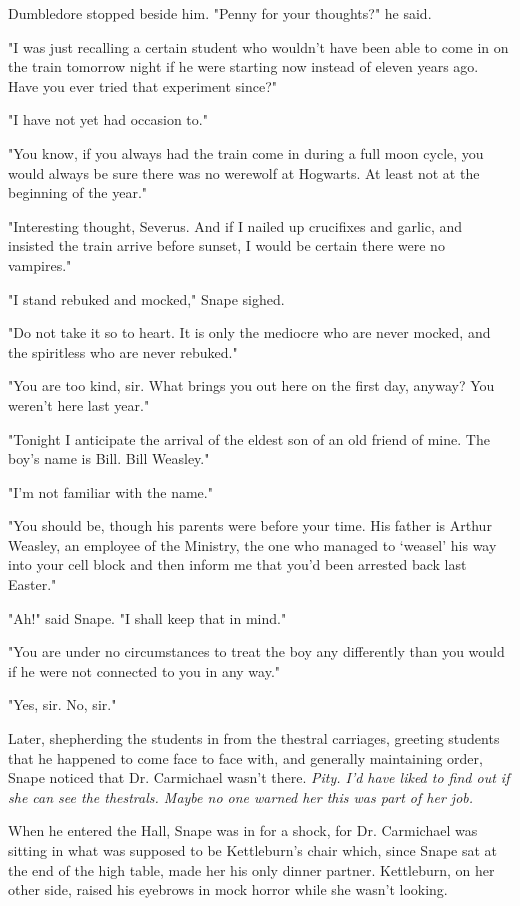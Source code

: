 Dumbledore stopped beside him. "Penny for your thoughts?" he said.

"I was just recalling a certain student who wouldn't have been able to come in on the train tomorrow night if he were starting now instead of eleven years ago. Have you ever tried that experiment since?"

"I have not yet had occasion to."

"You know, if you always had the train come in during a full moon cycle, you would always be sure there was no werewolf at Hogwarts. At least not at the beginning of the year."

"Interesting thought, Severus. And if I nailed up crucifixes and garlic, and insisted the train arrive before sunset, I would be certain there were no vampires."

"I stand rebuked and mocked," Snape sighed.

"Do not take it so to heart. It is only the mediocre who are never mocked, and the spiritless who are never rebuked."

"You are too kind, sir. What brings you out here on the first day, anyway? You weren't here last year."

"Tonight I anticipate the arrival of the eldest son of an old friend of mine. The boy's name is Bill. Bill Weasley."

"I'm not familiar with the name."

"You should be, though his parents were before your time. His father is Arthur Weasley, an employee of the Ministry, the one who managed to `weasel' his way into your cell block and then inform me that you'd been arrested back last Easter."

"Ah!" said Snape. "I shall keep that in mind."

"You are under no circumstances to treat the boy any differently than you would if he were not connected to you in any way."

"Yes, sir. No, sir."

Later, shepherding the students in from the thestral carriages, greeting students that he happened to come face to face with, and generally maintaining order, Snape noticed that Dr. Carmichael wasn't there. \emph{Pity. I'd have liked to find out if she can see the thestrals. Maybe no one warned her this was part of her job.}

When he entered the Hall, Snape was in for a shock, for Dr. Carmichael was sitting in what was supposed to be Kettleburn's chair which, since Snape sat at the end of the high table, made her his only dinner partner. Kettleburn, on her other side, raised his eyebrows in mock horror while she wasn't looking.

